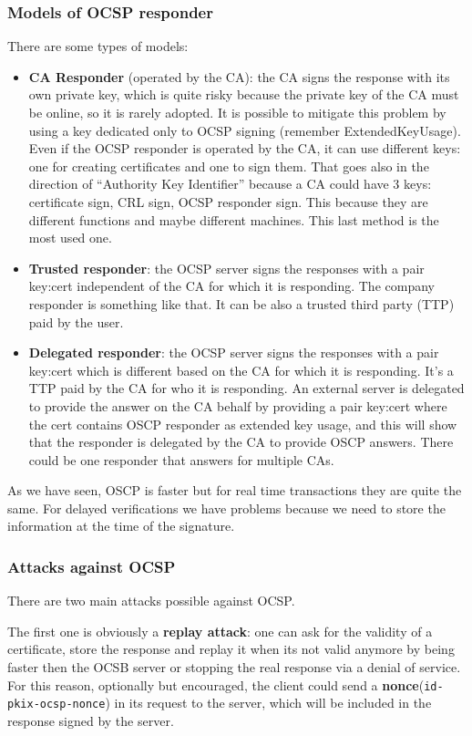 \subsubsection{Models of OCSP responder}
There are some types of models:
\begin{itemize}
  \item \textbf{CA Responder} (operated by the CA): the CA signs the
    response with its own private key, which is quite risky because
    the private key of the CA must be online, so it is rarely adopted.
    It is possible to mitigate this problem by using a key dedicated
    only to OCSP signing (remember ExtendedKeyUsage). Even if the OCSP
    responder is operated by the CA, it can use different keys: one
    for creating certificates and one to sign them. That goes also in
    the direction of “Authority Key Identifier” because a CA could
    have 3 keys: certificate sign, CRL sign, OCSP responder sign. This
    because they are different functions and maybe different machines.
    This last method is the most used one.
  \item \textbf{Trusted responder}: the OCSP server signs the
    responses with a pair key:cert independent of the CA for which it
    is responding. The company responder is something like that. It
    can be also a trusted third party (TTP) paid by the user.
\item \textbf{Delegated responder}: the OCSP server signs the
  responses with a pair key:cert which is different based on the CA
  for which it is responding. It’s a TTP paid by the CA for who it is
  responding. An external server is delegated to provide the answer on
  the CA behalf by providing a pair key:cert where the cert contains
  OSCP responder as extended key usage, and this will show that the
  responder is delegated by the CA to provide OSCP answers. There
  could be one responder that answers for multiple CAs.
\end{itemize}
As we have seen, OSCP is faster but for real time transactions they
are quite the same. For delayed verifications we have problems because
we need to store the information at the time of the signature.
\subsubsection{Attacks against OCSP}
There are two main attacks possible against OCSP.

The first one is obviously a \textbf{replay attack}: one can ask for 
the validity of a certificate, store the response and replay it when
its not valid anymore by being faster then the OCSB server or stopping
the real response via a denial of service. For this reason, optionally
but encouraged, the client could send a
\textbf{nonce}(\texttt{id-pkix-ocsp-nonce}) in its request to the
server, which will be included in the response signed by the server.

